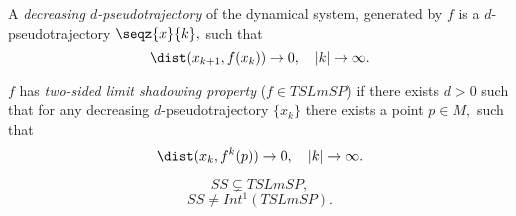 \begin{deff}
A \textit{decreasing $d$-pseudotrajectory} of the dynamical system, generated by $f$ is a $d$-pseudotrajectory $\seqz{x}{k},$ such that
\begin{equation*}
\dist(x_{k+1},f(x_k))\to 0,\quad |k|\to \infty.
\end{equation*}
\end{deff}

\begin{deff}
$f$ has \textit{two-sided limit shadowing property} ($f\in TSLmSP$)
if there exists $d>0$ such that for any decreasing $d$-pseudotrajectory $\{x_k\}$ there exists a point $p\in M,$ such that
$$
\dist(x_{k},f^k(p)) \to  0,\quad |k|\to \infty.
$$
\end{deff}

\begin{theorem}[Pilyugin, 2008]
$$ SS \subsetneq TSLmSP, $$
$$ SS \neq Int^1 (TSLmSP). $$
\end{theorem}
